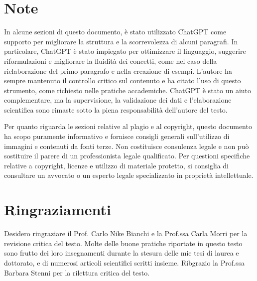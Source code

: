 \documentclass[9pt,a4paper,twoside]{rho-class/rho}
\begin{document}
\section*{Note}
In alcune sezioni di questo documento, è stato utilizzato ChatGPT come supporto per migliorare la struttura e la scorrevolezza di alcuni paragrafi. In particolare, ChatGPT è stato impiegato per ottimizzare il linguaggio, suggerire riformulazioni e migliorare la fluidità dei concetti, come nel caso della rielaborazione del primo paragrafo e nella creazione di esempi. L'autore ha sempre mantenuto il controllo critico sul contenuto e ha citato l’uso di questo strumento, come richiesto nelle pratiche accademiche. ChatGPT è stato un aiuto complementare, ma la supervisione, la validazione dei dati e l’elaborazione scientifica sono rimaste sotto la piena responsabilità dell'autore del testo.

Per quanto riguarda le sezioni relative al plagio e al copyright, questo documento ha scopo puramente informativo e fornisce consigli generali sull’utilizzo di immagini e contenuti da fonti terze. Non costituisce consulenza legale e non può sostituire il parere di un professionista legale qualificato. Per questioni specifiche relative a copyright, licenze e utilizzo di materiale protetto, si consiglia di consultare un avvocato o un esperto legale specializzato in proprietà intellettuale.

\section*{Ringraziamenti}
Desidero ringraziare il Prof. Carlo Nike Bianchi e la Prof.ssa Carla Morri per la revisione critica del testo. Molte delle buone pratiche riportate in questo testo sono frutto dei loro insegnamenti durante la stesura delle mie tesi di laurea e dottorato, e di numerosi articoli scientifici scritti insieme. Ribgrazio la Prof.ssa Barbara Stenni per la rilettura critica del testo.

\printbibliography
\end{document}
